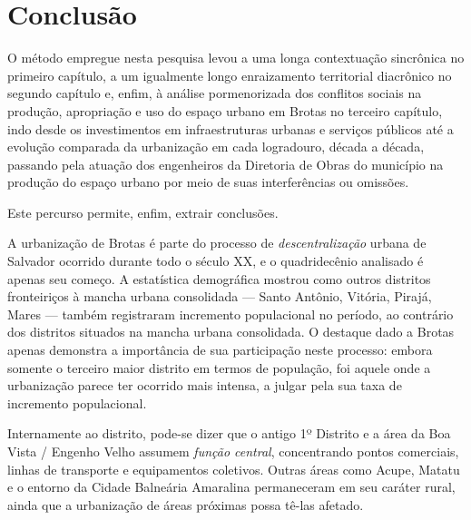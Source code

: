 \chapter*[Conclusão]{Conclusão}\label{concl}


O método empregue nesta pesquisa levou a uma longa contextuação sincrônica no primeiro capítulo, a um igualmente longo enraizamento territorial diacrônico no segundo capítulo e, enfim, à análise pormenorizada dos conflitos sociais na produção, apropriação e uso do espaço urbano em Brotas no terceiro capítulo, indo desde os investimentos em infraestruturas urbanas e serviços públicos até a evolução comparada da urbanização em cada logradouro, década a década, passando pela atuação dos engenheiros da Diretoria de Obras do município na produção do espaço urbano por meio de suas interferências ou omissões.

Este percurso permite, enfim, extrair conclusões. 

A urbanização de Brotas é parte do processo de \textit{descentralização} urbana de Salvador ocorrido durante todo o século XX, e o quadridecênio analisado é apenas seu começo. A estatística demográfica mostrou como outros distritos fronteiriços à mancha urbana consolidada --- Santo Antônio, Vitória, Pirajá, Mares --- também registraram incremento populacional no período, ao contrário dos distritos situados na mancha urbana consolidada. O destaque dado a Brotas apenas demonstra a importância de sua participação neste processo: embora somente o terceiro maior distrito em termos de população, foi aquele onde a urbanização parece ter ocorrido mais intensa, a julgar pela sua taxa de incremento populacional.

Internamente ao distrito, pode-se dizer que o antigo 1º Distrito e a área da Boa Vista / Engenho Velho assumem \textit{função central}, concentrando pontos comerciais, linhas de transporte e equipamentos coletivos. Outras áreas como Acupe, Matatu e o entorno da Cidade Balneária Amaralina permaneceram em seu caráter rural, ainda que a urbanização de áreas próximas possa tê-las afetado. 

